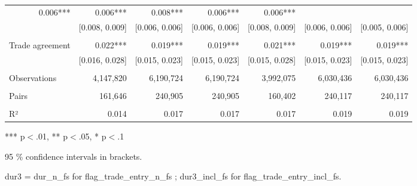 \begin{table}[!h]
\begin{tabular}{lllllll}
  \multicolumn{1}{r}{0.006***} &
  \multicolumn{1}{r}{0.006***} &
  \multicolumn{1}{r}{0.008***} &
  \multicolumn{1}{r}{0.006***} &
  \multicolumn{1}{r}{0.006***} \\
\multicolumn{1}{l}{} &
  \multicolumn{1}{|r}{[0.008,   0.009]} &
  \multicolumn{1}{r}{[0.006,   0.006]} &
  \multicolumn{1}{r}{[0.006,   0.006]} &
  \multicolumn{1}{r}{[0.008,   0.009]} &
  \multicolumn{1}{r}{[0.006,   0.006]} &
  \multicolumn{1}{r}{[0.005,   0.006]} \\
\multicolumn{1}{l}{} &
  \multicolumn{1}{|r}{} &
  \multicolumn{1}{r}{} &
  \multicolumn{1}{r}{} &
  \multicolumn{1}{r}{} &
  \multicolumn{1}{r}{} &
  \multicolumn{1}{r}{} \\
\multicolumn{1}{l}{Trade agreement} &
  \multicolumn{1}{|r}{0.022***} &
  \multicolumn{1}{r}{0.019***} &
  \multicolumn{1}{r}{0.019***} &
  \multicolumn{1}{r}{0.021***} &
  \multicolumn{1}{r}{0.019***} &
  \multicolumn{1}{r}{0.019***} \\
\multicolumn{1}{l}{} &
  \multicolumn{1}{|r}{[0.016,   0.028]} &
  \multicolumn{1}{r}{[0.015,   0.023]} &
  \multicolumn{1}{r}{[0.015,   0.023]} &
  \multicolumn{1}{r}{[0.015,   0.028]} &
  \multicolumn{1}{r}{[0.015,   0.023]} &
  \multicolumn{1}{r}{[0.015,   0.023]} \\
\multicolumn{1}{l}{} &
  \multicolumn{1}{|r}{} &
  \multicolumn{1}{r}{} &
  \multicolumn{1}{r}{} &
  \multicolumn{1}{r}{} &
  \multicolumn{1}{r}{} &
  \multicolumn{1}{r}{} \\
\multicolumn{1}{l}{Observations} &
  \multicolumn{1}{|r}{4,147,820} &
  \multicolumn{1}{r}{6,190,724} &
  \multicolumn{1}{r}{6,190,724} &
  \multicolumn{1}{r}{3,992,075} &
  \multicolumn{1}{r}{6,030,436} &
  \multicolumn{1}{r}{6,030,436} \\
\multicolumn{1}{l}{} &
  \multicolumn{1}{|r}{} &
  \multicolumn{1}{r}{} &
  \multicolumn{1}{r}{} &
  \multicolumn{1}{r}{} &
  \multicolumn{1}{r}{} &
  \multicolumn{1}{r}{} \\
\multicolumn{1}{l}{Pairs} &
  \multicolumn{1}{|r}{161,646} &
  \multicolumn{1}{r}{240,905} &
  \multicolumn{1}{r}{240,905} &
  \multicolumn{1}{r}{160,402} &
  \multicolumn{1}{r}{240,117} &
  \multicolumn{1}{r}{240,117} \\
\multicolumn{1}{l}{} &
  \multicolumn{1}{|r}{} &
  \multicolumn{1}{r}{} &
  \multicolumn{1}{r}{} &
  \multicolumn{1}{r}{} &
  \multicolumn{1}{r}{} &
  \multicolumn{1}{r}{} \\
\multicolumn{1}{l}{R²} &
  \multicolumn{1}{|r}{0.014} &
  \multicolumn{1}{r}{0.017} &
  \multicolumn{1}{r}{0.017} &
  \multicolumn{1}{r}{0.017} &
  \multicolumn{1}{r}{0.019} &
  \multicolumn{1}{r}{0.019} \\
\cline{1-7}
\end{tabular}

\footnotesize{
*** p$<$.01, ** p$<$.05, * p$<$.1

95 \% confidence intervals in brackets.

dur3 = dur\_n\_fs for flag\_trade\_entry\_n\_fs ; dur3\_incl\_fs for flag\_trade\_entry\_incl\_fs.
}
\end{table}
